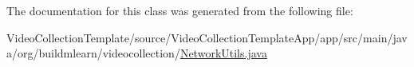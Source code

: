 The documentation for this class was generated from the following file\+:\begin{DoxyCompactItemize}
\item 
Video\+Collection\+Template/source/\+Video\+Collection\+Template\+App/app/src/main/java/org/buildmlearn/videocollection/\hyperlink{NetworkUtils_8java}{Network\+Utils.\+java}\end{DoxyCompactItemize}
